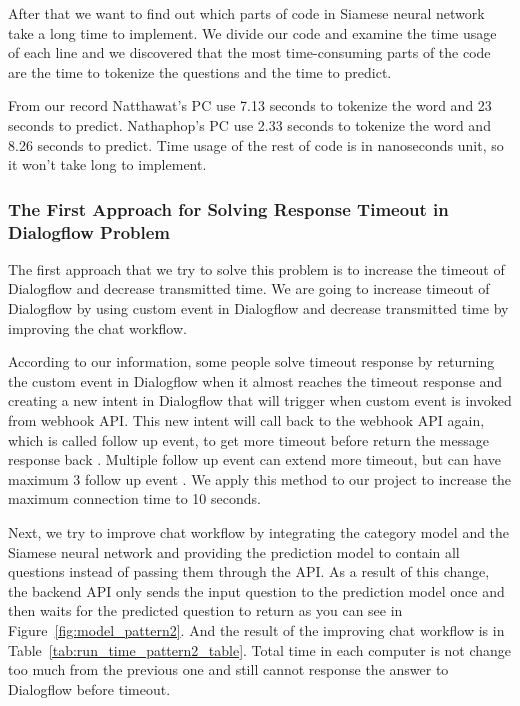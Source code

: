 \documentclass[12pt,oneside,openright,a4paper]{cpe-english-project}
\begin{document}
After that we want to find out which parts of code in Siamese neural network take a long
time to implement. We divide our code and examine the time usage of each line and we
discovered that the most time-consuming parts of the code are the time to tokenize the
questions and the time to predict.

From our record Natthawat's PC use 7.13 seconds to tokenize the word and 23 seconds to predict.
Nathaphop's PC use 2.33 seconds to tokenize the word and 8.26 seconds to predict.
Time usage of the rest of code is in nanoseconds unit, so it won't take long to implement.

\subsubsection{The First Approach for Solving Response Timeout in Dialogflow Problem}
The first approach that we try to solve this problem is to increase the timeout of Dialogflow
and decrease transmitted time. We are going to increase timeout of Dialogflow by using
custom event in Dialogflow and decrease transmitted time by improving the chat workflow.

According to our information, some people solve timeout response
by returning the custom event in Dialogflow when it almost reaches the timeout response and
creating a new intent in Dialogflow that will trigger when custom event is invoked from webhook API.
This new intent will call back to the webhook API again, which is called follow up event, to get more timeout
before return the message response back \cite{extend_webhook_intent}.
Multiple follow up event can extend more timeout, but can have maximum 3 follow up event \cite{changing_intent_webhook}.
We apply this method to our project to increase the maximum connection time to 10 seconds.

Next, we try to improve chat workflow by integrating the category model and the Siamese neural network and
providing the prediction model to contain all questions instead of passing them through the API. As a result
of this change, the backend API only sends the input question to the prediction model once and then waits for
the predicted question to return as you can see in Figure~\ref*{fig:model_pattern2}. And the result of the
improving chat workflow is in Table~\ref*{tab:run_time_pattern2_table}.
Total time in each computer is not change too much from the previous one and
still cannot response the answer to Dialogflow before timeout.
\end{document}
